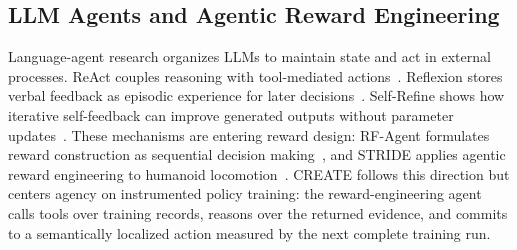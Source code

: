 \subsection{LLM Agents and Agentic Reward Engineering}
Language-agent research organizes LLMs to maintain state and act in external processes. ReAct couples reasoning with tool-mediated actions~\cite{react}. Reflexion stores verbal feedback as episodic experience for later decisions~\cite{reflexion}. Self-Refine shows how iterative self-feedback can improve generated outputs without parameter updates~\cite{selfrefine}. These mechanisms are entering reward design: RF-Agent formulates reward construction as sequential decision making~\cite{rfagent}, and STRIDE applies agentic reward engineering to humanoid locomotion~\cite{stride}. CREATE follows this direction but centers agency on instrumented policy training: the reward-engineering agent calls tools over training records, reasons over the returned evidence, and commits to a semantically localized action measured by the next complete training run.

